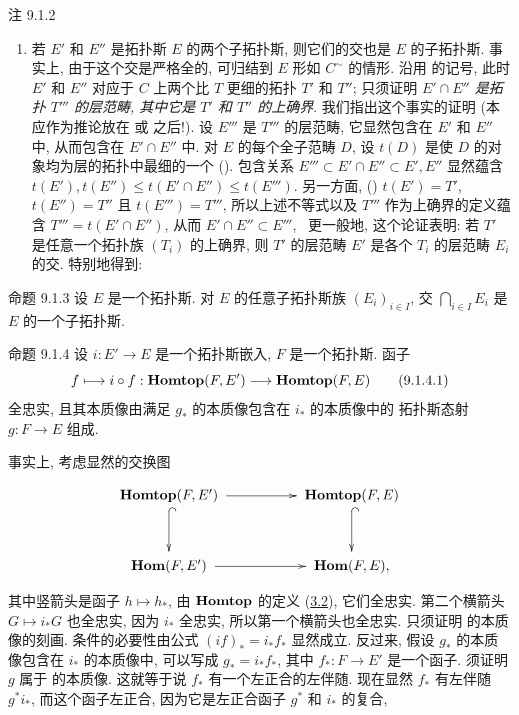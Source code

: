 \begin{enonce*}[remark]{注 9.1.2}
\begin{enumerate}
\item 若 $E'$ 和 $E''$ 是拓扑斯 $E$ 的两个子拓扑斯,
则它们的交也是 $E$ 的子拓扑斯.
事实上, 由于这个交是严格全的, 可归结到 $E$ 形如 $C^{\sim}$ 的情形.
沿用  的记号,
此时 $E'$ 和 $E''$ 对应于 $C$ 上两个比 $T$ 更细的拓扑 $T'$ 和 $T''$;
只须证明 \emph{$E'\cap E''$ 是拓扑 $T'''$ 的层范畴,
其中它是 $T'$ 和 $T''$ 的上确界}.
我们指出这个事实的证明
(本应作为推论放在 
或  之后!).
设 $E'''$ 是 $T'''$ 的层范畴,
它显然包含在 $E'$ 和 $E''$ 中, 从而包含在 $E'\cap E''$ 中.
对 $E$ 的每个全子范畴 $D$, 设 $t(D)$ 是使 $D$ 的对象均为层的拓扑中最细的一个
\pageoriginale ().
包含关系 $E'''\subset E'\cap E''\subset E',E''$ 显然蕴含
$t(E'),t(E'')\leq t(E'\cap E'')\leq t(E''')$.
另一方面,
()
$t(E')=T'$, $t(E'')=T''$ 且 $t(E''')=T'''$,
所以上述不等式以及 $T'''$ 作为上确界的定义蕴含
$T'''=t(E'\cap E'')$, 从而 $E'\cap E''\subset E'''$, \cqfd\
更一般地, 这个论证表明:
若 $T'$ 是任意一个拓扑族 $(T_i)$ 的上确界,
则 $T'$ 的层范畴 $E'$ 是各个 $T_i$ 的层范畴 $E_i$ 的交.
特别地得到:
\end{enumerate}
\end{enonce*}

\begin{enonce*}[remark]{命题 9.1.3}
设 $E$ 是一个拓扑斯.
对 $E$ 的任意子拓扑斯族 $(E_i)_{i\in I}$,
交 $\bigcap_{i\in I}E_i$ 是 $E$ 的一个子拓扑斯.
\end{enonce*}

\begin{enonce*}{命题 9.1.4}
设 $i:E'\rightarrow E$ 是一个拓扑斯嵌入, $F$ 是一个拓扑斯.
函子
\begin{equation*}
f\longmapsto i\circ f:\operatorname{\mathbf{Homtop}}(F,E')\longrightarrow
\operatorname{\mathbf{Homtop}}(F,E)\tag{9.1.4.1}
\end{equation*}
全忠实, 且其本质像由满足 $g_{\ast}$ 的本质像包含在 $i_{\ast}$ 的本质像中的
拓扑斯态射 $g:F\rightarrow E$ 组成.
\end{enonce*}

事实上, 考虑显然的交换图
\[
\xymatrix@C=1.75cm@R=1cm@M=6pt{
\Hhomtop (F,E') \ar @{^{(}->}[d] \ar[r]& \Hhomtop (F,E) \ar @{^{(}->}[d]\\
\Hhom (F,E') \ar[r] &\Hhom (F,E) , }
\]
其中竖箭头是函子 $h\mapsto h_{\ast}$,
由 $\operatorname{\mathbf{Homtop}}$ 的定义 (\hyperref[IV.subsec3.2]{3.2}), 它们全忠实.
第二个横箭头 $G\mapsto i_{\ast}G$ 也全忠实, 因为 $i_{\ast}$ 全忠实,
所以第一个横箭头也全忠实.
只须证明  的本质像的刻画.
条件的必要性由公式 $(if)_{\ast}=i_{\ast}f_{\ast}$ 显然成立.
反过来, 假设 $g_{\ast}$ 的本质像包含在 $i_{\ast}$ 的本质像中,
\ie 可以写成 $g_{\ast}=i_{\ast}f_{\ast}$,
其中 $f_{\ast}:F\rightarrow E'$ 是一个函子.
须证明 $g$ 属于  的本质像.
这就等于说 $f_{\ast}$ 有一个左正合的左伴随.
现在\pageoriginale 显然 $f_{\ast}$ 有左伴随 $g^{\ast}i_{\ast}$,
而这个函子左正合, 因为它是左正合函子 $g^{\ast}$ 和 $i_{\ast}$ 的复合, \cqfd

